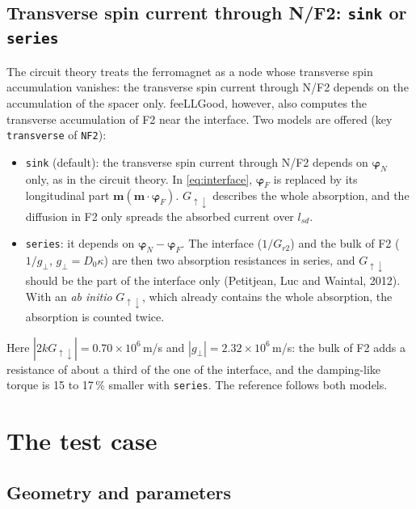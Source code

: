 \documentclass[11pt,a4paper]{article}
\newcommand{\vm}{\bm{m}}
\newcommand{\vphi}{\bm{\varphi}}
\begin{document}
\subsection{Transverse spin current through N/F2: \texttt{sink} or \texttt{series}}

The circuit theory treats the ferromagnet as a node whose transverse spin
accumulation vanishes: the transverse spin current through N/F2 depends on
the accumulation of the spacer only. feeLLGood, however, also computes the
transverse accumulation of F2 near the interface. Two models are offered
(key \texttt{transverse} of \texttt{NF2}):
\begin{itemize}
  \item \texttt{sink} (default): the transverse spin current through N/F2
    depends on $\vphi_N$ only, as in the circuit theory. In
    \eqref{eq:interface}, $\vphi_F$ is replaced by its longitudinal part
    $\vm(\vm\cdot\vphi_F)$. $G_{\uparrow\downarrow}$ describes the whole
    absorption, and the diffusion in F2 only spreads the absorbed current
    over $l_{sd}$.
  \item \texttt{series}: it depends on $\vphi_N - \vphi_F$. The interface
    ($1/G_{r2}$) and the bulk of F2 ($1/g_\perp$, $g_\perp = D_0\kappa$)
    are then two absorption resistances in series, and
    $G_{\uparrow\downarrow}$ should be the part of the interface only
    (Petitjean, Luc and Waintal, 2012). With an \emph{ab initio}
    $G_{\uparrow\downarrow}$, which already contains the whole absorption,
    the absorption is counted twice.
\end{itemize}
Here $|2kG_{\uparrow\downarrow}| = 0.70\times10^6$\,m/s and $|g_\perp| =
2.32\times10^6$\,m/s: the bulk of F2 adds a resistance of about a third of
the one of the interface, and the damping-like torque is 15 to 17\,\%
smaller with \texttt{series}. The reference follows both models.

\section{The test case}

\subsection{Geometry and parameters}
\end{document}
